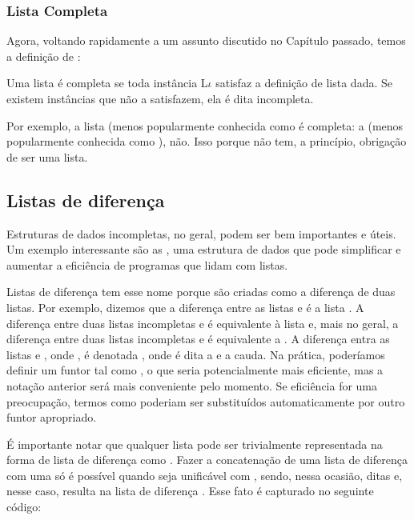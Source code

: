 \subsubsection{Lista Completa}

Agora, voltando rapidamente a um assunto discutido no Capítulo passado, temos a definição de :

\begin{definition} Uma lista  é completa se toda instância L$\iota$ satisfaz a definição de lista dada. Se existem instâncias que não a satisfazem, ela é dita incompleta.
\end{definition}

Por exemplo, a lista \codigo{[a,b,c]} (menos popularmente conhecida como   é completa: a \codigo{[a,b|Xs]} (menos popularmente conhecida como  ), não. Isso porque  não tem, a princípio, obrigação de ser uma lista.



\subsection{Listas de diferença}

Estruturas de dados incompletas, no geral, podem ser bem importantes e úteis. Um exemplo interessante são as , uma estrutura de dados que pode simplificar e aumentar a eficiência de programas que lidam com listas.

Listas de diferença tem esse nome porque são criadas como a diferença de duas listas. Por exemplo, dizemos que  a diferença entre as listas
\codigo{[a,b,c]} e \codigo{[c]} é a lista \codigo{[a,b]}. A diferença entre duas listas incompletas \codigo{[a,b|Xs]} e  é equivalente à lista \codigo{[a,b]} e, mais no geral, a diferença entre duas listas incompletas \codigo{[$x_0$, ...,$x_i$|Xs]} e  é equivalente a \codigo{[$x_0$, ...,$x_i$]}.
A diferença entra as listas  e , onde , é denotada , onde  é dita a  e  a cauda. Na prática,
poderíamos definir um funtor tal como , o que seria potencialmente mais eficiente, mas a notação anterior será
mais conveniente pelo momento. Se eficiência for uma preocupação, termos como  poderiam ser substituídos automaticamente por outro funtor apropriado.

É importante notar que qualquer lista  pode ser trivialmente representada na forma de lista de diferença como . Fazer a concatenação de uma lista de diferença  com uma 
só é possível quando  seja unificável com , sendo, nessa ocasião, ditas   e, nesse caso, resulta na lista de diferença . Esse fato é capturado no seguinte código:


